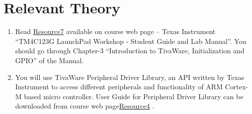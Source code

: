 \documentclass{article} %
\newcounter{source}
\begin{document}
\section {Relevant Theory}

\begin{enumerate}
\item 
Read \href{https://www.cse.iitb.ac.in/~erts/html_pages/Resources/Tiva/TM4C123G_LaunchPad_Workshop_Workbook.pdf}{Resource7} available on course web page -- Texas Instrument “TM4C123G
LaunchPad Workshop - Student Guide and Lab Manual”. You should go through Chapter-3
“Introduction to TivaWare, Initialization and GPIO” of the Manual.
\item
You will use TivaWare Peripheral Driver Library, an API written by Texas Instrument to
access different peripherals and functionality of ARM Cortex-M based micro controller. User
Guide for Peripheral Driver Library can be downloaded from course web page\href{https://www.cse.iitb.ac.in/~erts/html_pages/resources.html}{Resource4} .
\end{enumerate}








\end{document}
